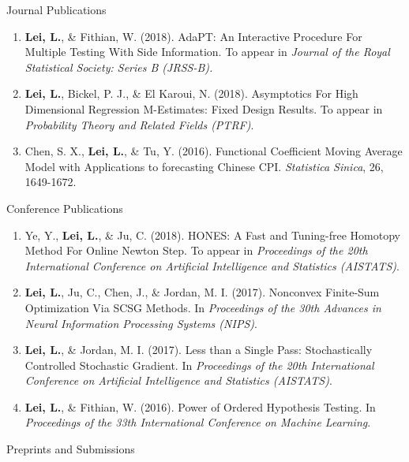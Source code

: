 \documentclass{article}
\begin{document}
\begin{large}
\noindent Journal Publications
\end{large}

\begin{enumerate}
\item \textbf{Lei, L.}, \& Fithian, W. (2018). AdaPT: An Interactive Procedure For Multiple Testing With Side Information. To appear in \emph{Journal of the Royal Statistical Society: Series B (JRSS-B).}
\item \textbf{Lei, L.}, Bickel, P. J., \& El Karoui, N. (2018). Asymptotics For High Dimensional Regression M-Estimates: Fixed Design Results. To appear in \emph{Probability Theory and Related Fields (PTRF)}.
\item Chen, S. X., \textbf{Lei, L.}, \& Tu, Y. (2016). Functional Coefficient Moving Average Model with Applications to forecasting Chinese CPI. \emph{Statistica Sinica}, 26, 1649-1672.
\end{enumerate}

\begin{large}
\noindent Conference Publications
\end{large}

\begin{enumerate}
\item Ye, Y., \textbf{Lei, L.}, \& Ju, C. (2018). HONES: A Fast and Tuning-free Homotopy Method For Online Newton Step. To appear in \emph{Proceedings of the 20th International Conference on Artificial Intelligence and Statistics (AISTATS)}.
\item \textbf{Lei, L.}, Ju, C., Chen, J., \& Jordan, M. I. (2017). Nonconvex Finite-Sum Optimization Via SCSG Methods. In \emph{Proceedings of the 30th Advances in Neural Information Processing Systems (NIPS)}.
\item \textbf{Lei, L.}, \& Jordan, M. I. (2017). Less than a Single Pass: Stochastically Controlled Stochastic Gradient. In \emph{Proceedings of the 20th International Conference on Artificial Intelligence and Statistics (AISTATS)}.
\item \textbf{Lei, L.}, \& Fithian, W. (2016). Power of Ordered Hypothesis Testing. In \emph{Proceedings of the 33th International
Conference on Machine Learning}.
\end{enumerate}

\begin{large}
\noindent Preprints and Submissions
\end{large}
\end{document}
